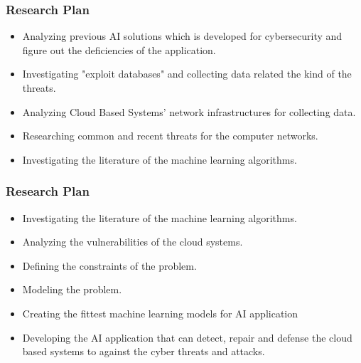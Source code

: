 \documentclass[slidestop,usepdftitle=false]{beamer}
\begin{document}
\begin{frame}
  \frametitle{Research Plan} 
   \begin{slide}
    \begin{itemize}
        \item {
            Analyzing previous AI solutions which is developed for cybersecurity and figure out the deficiencies of the application. 
         }
        
         \item{
            Investigating "exploit databases" and collecting data related the kind of the threats.  
         }
         \item {
            Analyzing Cloud Based Systems' network infrastructures for collecting data. 
         }
        
         \item {
            Researching common and recent threats for the computer networks.
         }
     
         \item {
            Investigating the literature of the machine learning algorithms. 
        }
     \end{itemize}
   \end{slide}
\end{frame}

\begin{frame}
  \frametitle{Research Plan} 
   \begin{slide}
    \begin{itemize}
      \item {
        Investigating the literature of the machine learning algorithms. 
    }
    \item {
        Analyzing the vulnerabilities of the cloud systems.   
    }
 
     \item {
        Defining the constraints of the problem.
     }
 
     \item {
        Modeling the problem. 
     }
     \item {
        Creating the fittest machine learning models for AI application 
     }
     \item {
        Developing the AI application that can detect, repair and defense the cloud based systems to against the cyber threats and attacks.
     }
     \end{itemize}
   \end{slide}
\end{frame}
\end{document}
